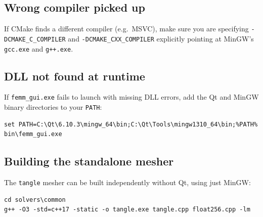 \documentclass[11pt]{article}
\begin{document}
\subsection{Wrong compiler picked up}

If CMake finds a different compiler (e.g.\ MSVC), make sure you are
specifying \texttt{-DCMAKE\_C\_COMPILER} and
\texttt{-DCMAKE\_CXX\_COMPILER} explicitly pointing at MinGW's
\texttt{gcc.exe} and \texttt{g++.exe}.

\subsection{DLL not found at runtime}

If \texttt{femm\_gui.exe} fails to launch with missing DLL errors,
add the Qt and MinGW binary directories to your \texttt{PATH}:
\begin{lstlisting}
set PATH=C:\Qt\6.10.3\mingw_64\bin;C:\Qt\Tools\mingw1310_64\bin;%PATH%
bin\femm_gui.exe
\end{lstlisting}

\subsection{Building the standalone mesher}

The \texttt{tangle} mesher can be built independently without Qt,
using just MinGW:
\begin{lstlisting}
cd solvers\common
g++ -O3 -std=c++17 -static -o tangle.exe tangle.cpp float256.cpp -lm
\end{lstlisting}
\end{document}
